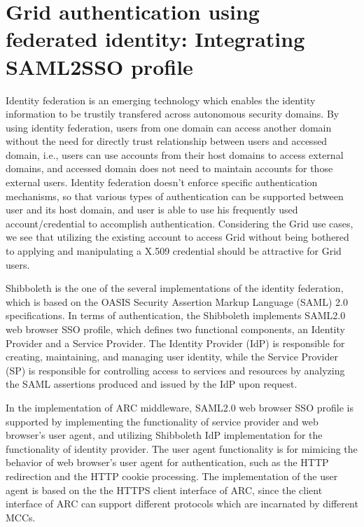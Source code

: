 \documentclass[conference]{IEEEtran}
\begin{document}
\section{Grid authentication using federated identity: Integrating SAML2SSO profile}
\label{sec:intergrationSAML2SSO}
Identity federation is an emerging technology which enables the identity information to be trustily transfered across autonomous security domains. By using identity federation, users from one domain can access another domain without the need for directly trust relationship between users and accessed domain, i.e., users can use accounts from their host domains to access external domains, and accessed domain does not need to maintain accounts for those external users. Identity federation doesn't enforce specific authentication mechanisms, so that various types of authentication can be supported between user and its host domain, and user is able to use his frequently used account/credential to accomplish authentication. Considering the Grid use cases, we see that utilizing the existing account to access Grid without being bothered to applying and manipulating a X.509 credential should be attractive for Grid users.

Shibboleth is the one of the several implementations of the identity federation, which is based on the OASIS Security Assertion Markup Language (SAML) 2.0 specifications. In terms of authentication, the Shibboleth implements SAML2.0 web browser SSO profile, which  defines two functional components, an Identity Provider and a Service Provider. The Identity Provider (IdP) is responsible for creating, maintaining, and managing user identity, while the Service Provider (SP) is responsible for controlling access to services and resources by analyzing the SAML assertions produced and issued by the IdP upon request.

In the implementation of ARC middleware, SAML2.0 web browser SSO profile is supported by implementing the functionality of service provider and web browser's user agent, and utilizing Shibboleth IdP implementation for the functionality of identity provider. The user agent functionality is for mimicing the behavior of web browser's user agent for authentication, such as the HTTP redirection and the HTTP cookie processing. The implementation of the user agent is based on the the HTTPS client interface of ARC, since the client interface of ARC can support different protocols which are incarnated by different MCCs.
\end{document}
